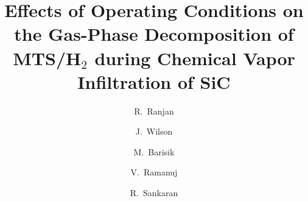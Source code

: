 \documentclass[final, letterpaper, square, comma, numbers, sort&compress]{elsarticle}
\begin{document}
\begin{frontmatter}


\title{Effects of Operating Conditions on the Gas-Phase Decomposition of \\ MTS/H$_2$ during Chemical Vapor Infiltration of SiC }

\author[1]{R.~Ranjan}
\author[1]{J.~Wilson}
\author[1]{M.~Barisik}
\author[2]{V.~Ramanuj}
\author[2]{R.~Sankaran}

\address[1]{Department of Mechanical Engineering, The University of Tennessee Chattanooga \\
615 McCallie Avenue, Chattanooga, TN 37403, USA}
\address[2]{Computational Sciences and Engineering Division, Oak Ridge National Laboratory \\
1 Bethel Valley Rd., Oak Ridge, TN 37831, USA}


\end{frontmatter}
\end{document}
